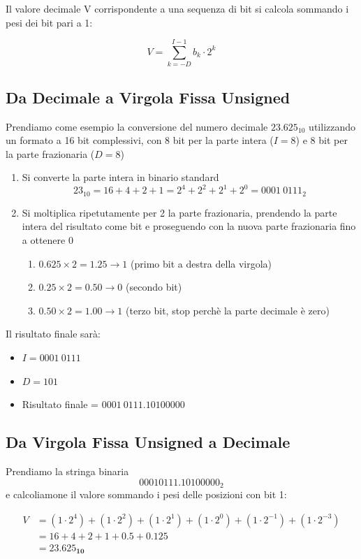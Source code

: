 Il valore decimale V corrispondente a una sequenza di bit si calcola sommando i pesi dei bit pari a 1:


{
    \LARGE
    $$
    \displaystyle V = \sum_{k=-D}^{I-1} b_k \cdot 2^k
    $$
}


\subsection{Da Decimale a Virgola Fissa Unsigned}
Prendiamo come esempio la conversione del numero decimale $23.625_{10}$ utilizzando un formato a 16 bit complessivi, con 8 bit per la parte intera ($I=8$) e 8 bit per la parte frazionaria ($D=8$)

\begin{enumerate}
    \item Si converte la parte intera in binario standard 
    {\large $$23_{10} = 16 + 4 + 2 + 1 = 2^4 + 2^2 + 2^1 + 2^0 = 0001\ 0111_{2}$$}
    
    \item Si moltiplica ripetutamente per 2 la parte frazionaria, prendendo la parte intera del risultato come bit e proseguendo con la nuova parte frazionaria fino a ottenere 0
    \begin{enumerate}
        \item $0.625 \times 2 = 1.25 \to 1$ (primo bit a destra della virgola)
        \item $0.25 \times 2 = 0.50 \to 0$ (secondo bit)
        \item $0.50 \times 2 = 1.00 \to 1$ (terzo bit, stop perchè la parte decimale è zero)
    \end{enumerate}
\end{enumerate}

Il risultato finale sarà:
\begin{itemize}
    \item $I = 0001\ 0111$
    \item $D = 101$
    \item Risultato finale = $0001\ 0111.10100000$
\end{itemize}

\subsection{Da Virgola Fissa Unsigned a Decimale}
Prendiamo la stringa binaria $$00010111.10100000_2$$ e calcoliamone il valore sommando i pesi delle posizioni con bit 1:

{
    \large
    $$\begin{aligned} V &= (1 \cdot 2^4) + (1 \cdot 2^2) + (1 \cdot 2^1) + (1 \cdot 2^0) + (1 \cdot 2^{-1}) + (1 \cdot 2^{-3}) \\ &= 16 + 4 + 2 + 1 + 0.5 + 0.125 \\ &= \mathbf{23.625_{10}}\end{aligned}$$
}

